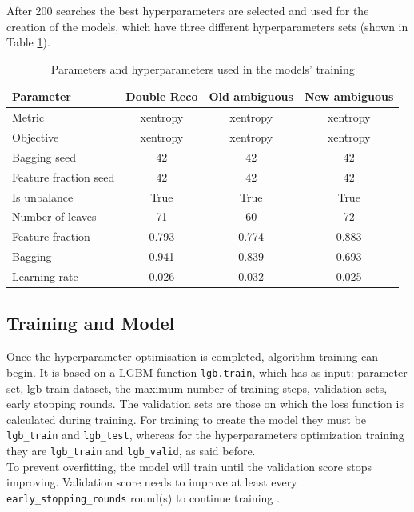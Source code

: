 \documentclass[a4paper, oneside]{book}
\begin{document}
				After 200 searches the best hyperparameters are selected and used for the creation of the models, which have three different hyperparameters sets (shown in Table \ref{tab:parameters}).
				
				\begin{table}
					\centering
					\begin{tabular}{lccc}
						\toprule[1.5pt]
						\textbf{Parameter} & \textbf{Double Reco} & \textbf{Old ambiguous} & \textbf{New ambiguous} \\
						\midrule
						Metric & xentropy & xentropy & xentropy \\
						Objective & xentropy & xentropy & xentropy \\
						Bagging seed & 42  & 42 & 42 \\
						Feature fraction seed & 42 & 42 & 42 \\
						Is unbalance & True & True & True \\
						Number of leaves & 71 & 60 & 72 \\
						Feature fraction & 0.793 & 0.774 & 0.883 \\
						Bagging & 0.941 & 0.839 & 0.693 \\
						Learning rate & 0.026 & 0.032 & 0.025 \\
						\bottomrule[1.5pt]
					\end{tabular}
					\caption{Parameters and hyperparameters used in the models' training}
					\label{tab:parameters} 
				\end{table}
			
			\subsection{Training and Model}
				Once the hyperparameter optimisation is completed, algorithm training can begin. It is based on a LGBM function \texttt{lgb.train}, which has as input: parameter set, lgb train dataset, the maximum number of training steps, validation sets,  early stopping rounds. The validation sets are those on which the loss function is calculated during training. For training to create the model they must be \texttt{lgb\_train} and \texttt{lgb\_test}, whereas for the hyperparameters optimization training they are \texttt{lgb\_train} and \texttt{lgb\_valid}, as said before. \\
				To prevent overfitting, the model will train until the validation score stops improving. Validation score needs to improve at least every \texttt{early\_stopping\_rounds} round(s) to continue training \cite{LGBM}.
				
\end{document}
